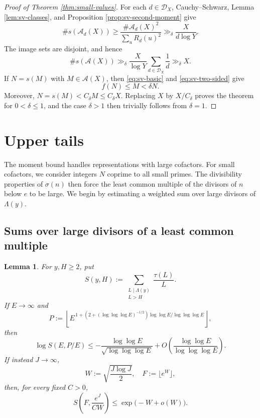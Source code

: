 \documentclass[11pt,letterpaper,reqno]{amsart}
\numberwithin{equation}{section}
\newtheorem{lemma}[theorem]{Lemma}
\theoremstyle{remark}
\renewcommand{\leq}{\leqslant}
\renewcommand{\geq}{\geqslant}
\begin{document}
\begin{proof}[Proof of Theorem \ref{thm:small-values}]
For each $d\in\mathcal{D}_X$, Cauchy--Schwarz,
Lemma \ref{lem:sv-classes}, and Proposition \ref{prop:sv-second-moment} give
\[
 \#s(\mathcal{A}_d(X))
 \geq\frac{\#\mathcal{A}_d(X)^2}{\sum_uR_d(u)^2}
 \gg_\delta\frac{X}{d\log Y}.
\]
The image sets are disjoint, and hence
\[
 \#s(\mathcal{A}(X))
 \gg_\delta\frac{X}{\log Y}
 \sum_{d\in\mathcal{D}_X}\frac1d
 \gg_\delta X.
\]
If $N=s(M)$ with $M\in\mathcal{A}(X)$, then
\eqref{eq:sv-basic} and \eqref{eq:sv-two-sided} give
\[
 f(N)\leq M<\delta N.
\]
Moreover, $N=s(M)<C_\delta M\leq C_\delta X$. Replacing $X$ by $X/C_\delta$ proves the theorem
for $0<\delta\leq1$, and the case $\delta>1$ then trivially follows from $\delta=1$.
\end{proof}


\section{Upper tails}

The moment bound handles representations with large cofactors. For small
cofactors, we consider integers $N$ coprime to all small primes. The
divisibility properties of $\sigma(n)$ then force the least common multiple
of the divisors of $n$ below $e$ to be large. We begin by estimating a
weighted sum over large divisors of $\Lambda(y)$.

\subsection{Sums over large divisors of a least common multiple}

\begin{lemma}
\label{lem:kernel-tails}
For $y,H\geq2$, put
\[
 S(y,H):=\sum_{\substack{L\mid \Lambda(y)\\L>H}}\frac{\tau(L)}L.
\]
If $E\to\infty$ and
\[
 P:=\left\lfloor
 E^{\,1+(2+(\log\log\log E)^{-1/2})\log\log E/\log\log\log E}
 \right\rfloor,
\]
then
\begin{equation}\label{eq:fixed-kernel-tail}
 \log S(E,P/E)
 \leq-\frac{\log\log E}{\sqrt{\log\log\log E}}
 +O\left(\frac{\log\log E}{\log\log\log E}\right).
\end{equation}
If instead $J\to\infty$,
\[
 W:=\sqrt{\frac{J\log J}{2}},
 \quad F:=\lfloor e^W\rfloor,
\]
then, for every fixed $C>0$,
\begin{equation}\label{eq:moving-kernel-tail}
 S\left(F,\frac{e^J}{CW}\right)
 \leq\exp\bigl(-W+o(W)\bigr).
\end{equation}
\end{lemma}
\end{document}
